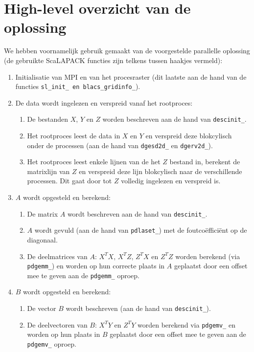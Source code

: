 \documentclass[a4paper,12pt]{report}
\begin{document}
\section{High-level overzicht van de oplossing}
We hebben voornamelijk gebruik gemaakt van de voorgestelde parallelle oplossing (de gebruikte ScaLAPACK functies zijn telkens tussen haakjes vermeld):

\begin{enumerate}
	\item Initialisatie van MPI en van het procesraster (dit laatste aan de hand van de functies \texttt{sl\_init\_ en blacs\_gridinfo\_}).
	\item De data wordt ingelezen en verspreid vanaf het rootproces:
	\begin{enumerate}
		\item De bestanden $X$, $Y$ en $Z$ worden beschreven aan de hand van \texttt{descinit\_}.
		\item Het rootproces leest de data in $X$ en $Y$ en verspreid deze blokcylisch onder de processen (aan de hand van \texttt{dgesd2d\_} en \texttt{dgerv2d\_}).
		\item Het rootproces leest enkele lijnen van de het $Z$ bestand in, berekent de matrixlijn van $Z$ en verspreid deze lijn blokcylisch naar de verschillende processen. Dit gaat door tot $Z$ volledig ingelezen en verspreid is.
	\end{enumerate}
	\item $A$ wordt opgesteld en berekend:
	\begin{enumerate}
		\item De matrix $A$ wordt beschreven aan de hand van \texttt{descinit\_}.
		\item $A$ wordt gevuld (aan de hand van \texttt{pdlaset\_}) met de foutco\"effici\"ent op de diagonaal.
		\item De deelmatrices van $A$: $X^TX$, $X^TZ$, $Z^TX$ en $Z^TZ$ worden berekend (via \texttt{pdgemm\_}) en worden op hun correcte plaats in $A$ geplaatst door een offset mee te geven aan de \texttt{pdgemm\_} oproep.
	\end{enumerate}
	\item $B$ wordt opgesteld en berekend:
		\begin{enumerate}
			\item De vector $B$ wordt beschreven (aan de hand van \texttt{descinit\_}).
			\item De deelvectoren van $B$: $X^TY$ en $Z^TY$ worden berekend via \texttt{pdgemv\_} en worden op hun plaats in $B$ geplaatst door een offset mee te geven aan de \texttt{pdgemv\_} oproep.

\end{enumerate}
\end{enumerate}
\end{document}
